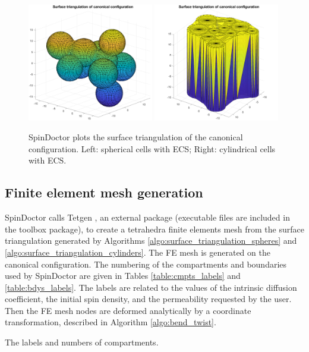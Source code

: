\documentclass[a4paper]{article}
\begin{document}
\begin{figure}
    \centering
    \includegraphics[width=0.49\textwidth]{plot_surftri/spheres.png}
    \includegraphics[width=0.49\textwidth]{plot_surftri/cylinders.png}
    \caption{SpinDoctor plots the surface triangulation of the canonical configuration. Left: spherical cells with ECS; Right: cylindrical cells with ECS.}
    \label{fig:plot_surface_triangulation}
\end{figure}




\subsection{Finite element mesh generation}

SpinDoctor calls Tetgen \cite{tetgen}, an external package (executable files are included in the toolbox package), to create a tetrahedra finite elements mesh from the surface triangulation generated by Algorithms \ref{algo:surface_triangulation_spheres} and \ref{algo:surface_triangulation_cylinders}. The FE mesh is generated on the canonical configuration. The numbering of the compartments and boundaries used by SpinDoctor are given in Tables \ref{table:cmpts_labels} and \ref{table:bdys_labels}. The labels are related to the values of the intrinsic diffusion coefficient, the initial spin density, and the permeability requested by the user. Then the FE mesh nodes are deformed analytically by a coordinate transformation, described in Algorithm \ref{algo:bend_twist}.
\begin{table}
    \centering
    
    \caption{The labels and numbers of compartments.}
    \label{table:cmpts_labels}
\end{table}
\end{document}

